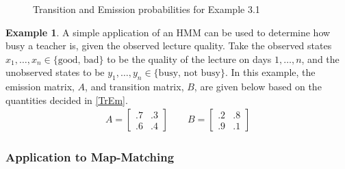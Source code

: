 \documentclass{article}
\numberwithin{equation}{section}
\theoremstyle{definition}
\newtheorem{example}[example]{Example}
\begin{document}
\begin{figure}[h!]
    \centering
    \caption{Transition and Emission probabilities for Example 3.1 }
    \label{TrEm}

\end{figure}
\begin{example} 
A simple application of an HMM can be used to determine how busy a teacher is, given the observed lecture quality. Take the observed states $x_1,\dots,x_n\in \{\text{good, bad}\}$ to be the quality of the lecture on days $1,\dots, n$, and the unobserved states to be $y_1,\dots,y_n\in \{\text{busy, not busy}\}$. In this example, the emission matrix, $A$, and transition matrix, $B$, are given below based on the quantities decided in \autoref{TrEm}. 
\begin{align*}
    A = \begin{bmatrix}
    .7 & .3 \\
    .6 & .4 
    \end{bmatrix} \qquad 
     B = \begin{bmatrix}
    .2 & .8 \\
    .9 & .1
    \end{bmatrix} 
\end{align*}

\end{example}







\subsubsection*{Application to Map-Matching}
\end{document}
